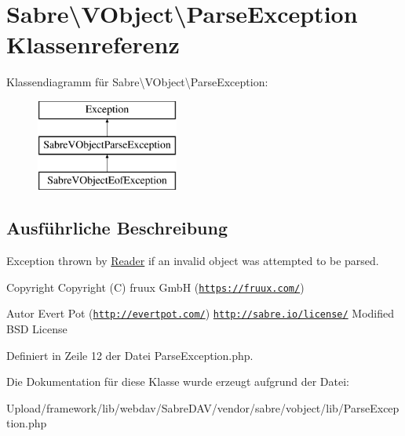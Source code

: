 \hypertarget{class_sabre_1_1_v_object_1_1_parse_exception}{}\section{Sabre\textbackslash{}V\+Object\textbackslash{}Parse\+Exception Klassenreferenz}
\label{class_sabre_1_1_v_object_1_1_parse_exception}
Klassendiagramm für Sabre\textbackslash{}V\+Object\textbackslash{}Parse\+Exception\+:\begin{figure}[H]
\begin{center}
\leavevmode
\includegraphics[height=3.000000cm]{class_sabre_1_1_v_object_1_1_parse_exception}
\end{center}
\end{figure}


\subsection{Ausführliche Beschreibung}
Exception thrown by \mbox{\hyperlink{class_sabre_1_1_v_object_1_1_reader}{Reader}} if an invalid object was attempted to be parsed.

\begin{DoxyCopyright}{Copyright}
Copyright (C) fruux GmbH (\href{https://fruux.com/}{\tt https\+://fruux.\+com/}) 
\end{DoxyCopyright}
\begin{DoxyAuthor}{Autor}
Evert Pot (\href{http://evertpot.com/}{\tt http\+://evertpot.\+com/})  \href{http://sabre.io/license/}{\tt http\+://sabre.\+io/license/} Modified B\+SD License 
\end{DoxyAuthor}


Definiert in Zeile 12 der Datei Parse\+Exception.\+php.



Die Dokumentation für diese Klasse wurde erzeugt aufgrund der Datei\+:\begin{DoxyCompactItemize}
\item 
Upload/framework/lib/webdav/\+Sabre\+D\+A\+V/vendor/sabre/vobject/lib/Parse\+Exception.\+php\end{DoxyCompactItemize}
